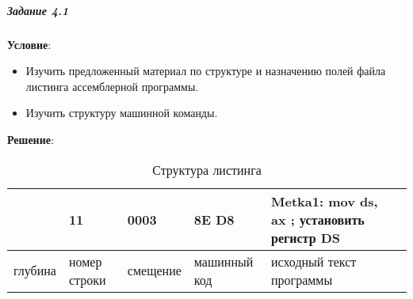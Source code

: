 \subparagraph{Задание 4.1}

\textbf{Условие}:
\begin{itemize}
   \item Изучить предложенный материал по структуре и назначению полей файла листинга ассемблерной программы. 
   \item Изучить структуру машинной команды.
\end{itemize}

\textbf{Решение}:

\begin{table}[!ht]
   \centering
   \caption{Структура листинга}
   \begin{tabular}{|l|p{1.3cm}|l|p{2cm}|l|l|} 
      \hline
               & 11           & 0003      & 8E D8        & Metka1:   mov   ds, ax   ; установить регистр DS \\ \hline
      глубина  & номер строки & смещение  & машинный код & исходный текст программы                         \\ \hline
   \end{tabular}
\end{table}
